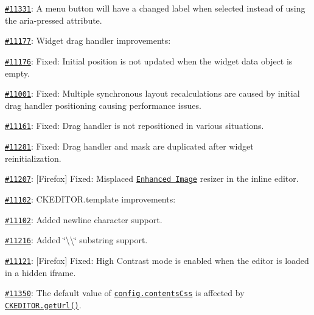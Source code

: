 {\ttfamily 
\begin{DoxyItemize}
\item \href{http://dev.ckeditor.com/ticket/11331}{\tt \#11331}\+: A menu button will have a changed label when selected instead of using the {\ttfamily aria-\/pressed} attribute.
\item \href{http://dev.ckeditor.com/ticket/11177}{\tt \#11177}\+: Widget drag handler improvements\+:
\begin{DoxyItemize}
\item \href{http://dev.ckeditor.com/ticket/11176}{\tt \#11176}\+: Fixed\+: Initial position is not updated when the widget data object is empty.
\item \href{http://dev.ckeditor.com/ticket/11001}{\tt \#11001}\+: Fixed\+: Multiple synchronous layout recalculations are caused by initial drag handler positioning causing performance issues.
\item \href{http://dev.ckeditor.com/ticket/11161}{\tt \#11161}\+: Fixed\+: Drag handler is not repositioned in various situations.
\item \href{http://dev.ckeditor.com/ticket/11281}{\tt \#11281}\+: Fixed\+: Drag handler and mask are duplicated after widget reinitialization.
\end{DoxyItemize}
\item \href{http://dev.ckeditor.com/ticket/11207}{\tt \#11207}\+: \mbox{[}Firefox\mbox{]} Fixed\+: Misplaced \href{http://ckeditor.com/addon/image2}{\tt Enhanced Image} resizer in the inline editor.
\item \href{http://dev.ckeditor.com/ticket/11102}{\tt \#11102}\+: {\ttfamily C\+K\+E\+D\+I\+T\+O\+R.\+template} improvements\+:
\begin{DoxyItemize}
\item \href{http://dev.ckeditor.com/ticket/11102}{\tt \#11102}\+: Added newline character support.
\item \href{http://dev.ckeditor.com/ticket/11216}{\tt \#11216}\+: Added \char`\"{}\textbackslash{}\textbackslash{}\textquotesingle{}\char`\"{} substring support.
\end{DoxyItemize}
\item \href{http://dev.ckeditor.com/ticket/11121}{\tt \#11121}\+: \mbox{[}Firefox\mbox{]} Fixed\+: High Contrast mode is enabled when the editor is loaded in a hidden iframe.
\item \href{http://dev.ckeditor.com/ticket/11350}{\tt \#11350}\+: The default value of \href{http://docs.ckeditor.com/#!/api/CKEDITOR.config-cfg-contentsCss}{\tt {\ttfamily config.\+contents\+Css}} is affected by \href{http://docs.ckeditor.com/#!/api/CKEDITOR-method-getUrl}{\tt {\ttfamily C\+K\+E\+D\+I\+T\+O\+R.\+get\+Url()}}.

\end{DoxyItemize}}
